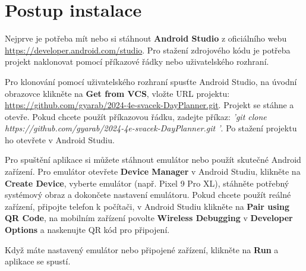 \chapter{Postup instalace}
\hspace{14pt} Nejprve je potřeba mít nebo si stáhnout \textbf{Android Studio} z oficiálního webu \url{https://developer.android.com/studio}. Pro stažení zdrojového kódu je potřeba projekt naklonovat pomocí příkazové řádky nebo uživatelského rozhraní.

Pro klonování pomocí uživatelského rozhraní spusťte Android Studio, na úvodní obrazovce klikněte na \textbf{Get from VCS}, vložte URL projektu: \url{https://github.com/gyarab/2024-4e-svacek-DayPlanner.git}. Projekt se stáhne a otevře. Pokud chcete použít příkazovou řádku, zadejte příkaz: 
\textit{'git clone https://github.com/gyarab/2024-4e-svacek-DayPlanner.git '}. Po stažení projektu ho otevřete v Android Studiu.

Pro spuštění aplikace si můžete stáhnout emulátor nebo použít skutečné Android zařízení. Pro emulátor otevřete \textbf{Device Manager} v Android Studiu, klikněte na \textbf{Create Device}, vyberte emulátor (např. Pixel 9 Pro XL), stáhněte potřebný systémový obraz a dokončete nastavení emulátoru. Pokud chcete použít reálné zařízení, připojte telefon k počítači, v Android Studiu klikněte na \textbf{Pair using QR Code}, na mobilním zařízení povolte \textbf{Wireless Debugging} v \textbf{Developer Options} a naskenujte QR kód pro připojení.

Když máte nastavený emulátor nebo připojené zařízení, klikněte na \textbf{Run} a aplikace se spustí.